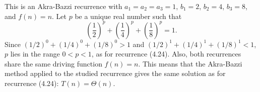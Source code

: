 This is an Akra-Bazzi recurrence with $a_1=a_2=a_3=1$, $b_1=2$, $b_2=4$, $b_3=8$, and $f(n)=n$.
Let $p$ be a unique real number such that
\[
    \left(\frac{1}{2}\right)^p+\left(\frac{1}{4}\right)^p+\left(\frac{1}{8}\right)^p = 1.
\]
Since $(1/2)^0+(1/4)^0+(1/8)^0>1$ and $(1/2)^1+(1/4)^1+(1/8)^1<1$, $p$ lies in the range $0<p<1$, as for recurrence (4.24).
Also, both recurrences share the same driving function $f(n)=n$.
This means that the Akra-Bazzi method applied to the studied recurrence gives the same solution as for recurrence (4.24): $T(n)=\Theta(n)$.
